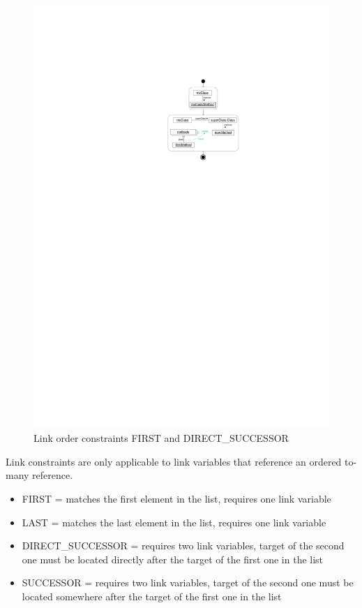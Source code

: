 {\begin{figure}[p]
  \centering
  \includegraphics[scale=.8]{figures/LinkConstraints1}
  \caption{Link order constraints FIRST and DIRECT\_SUCCESSOR}
  \label{fig:linkConstraints}
\end{figure}

Link constraints are only applicable to link variables that reference an ordered to-many reference.

\begin{itemize}
  \item FIRST = matches the first element in the list, requires one link variable
  \item LAST = matches the last element in the list, requires one link variable
  \item DIRECT\_SUCCESSOR = requires two link variables, target of the second one must be located directly after the target of the first one in the list
  \item SUCCESSOR = requires two link variables, target of the second one must be located somewhere after the target of the first one in the list
\end{itemize}

}
